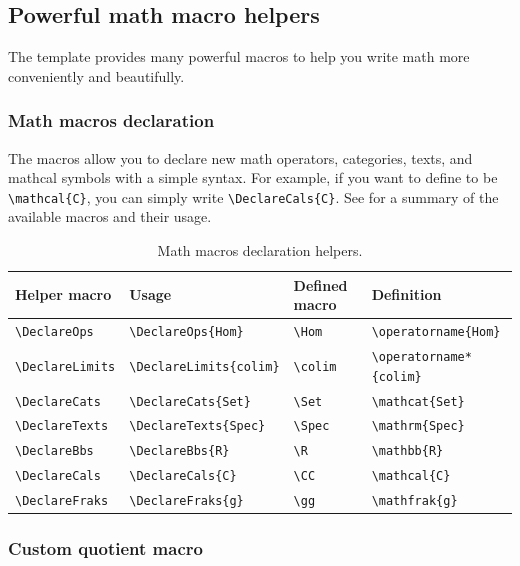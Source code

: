 \subsection{Powerful math macro helpers}

The template provides many powerful macros to help you write math more conveniently and beautifully.

\subsubsection{Math macros declaration}

The  macros allow you to declare new math operators, categories, texts, and mathcal symbols with a simple syntax.
For example, if you want to define \macro{\CC} to be \verb|\mathcal{C}|, you can simply write \verb|\DeclareCals{C}|.
See  for a summary of the available macros and their usage.

\begin{table}[!ht]
  \centering

  \begin{tabular}{llll}
    \hline\hline
    \textbf{Helper macro} & \textbf{Usage} & \textbf{Defined macro} & \textbf{Definition} \\
    \hline
    \verb|\DeclareOps| & \verb|\DeclareOps{Hom}| & \verb|\Hom| & \verb|\operatorname{Hom}| \\
    \verb|\DeclareLimits| & \verb|\DeclareLimits{colim}| & \verb|\colim| & \verb|\operatorname*{colim}| \\
    \verb|\DeclareCats| & \verb|\DeclareCats{Set}| & \verb|\Set| & \verb|\mathcat{Set}| \\
    \verb|\DeclareTexts| & \verb|\DeclareTexts{Spec}| & \verb|\Spec| & \verb|\mathrm{Spec}| \\
    \verb|\DeclareBbs| & \verb|\DeclareBbs{R}| & \verb|\R| & \verb|\mathbb{R}| \\
    \verb|\DeclareCals| & \verb|\DeclareCals{C}| & \verb|\CC| & \verb|\mathcal{C}| \\
    \verb|\DeclareFraks| & \verb|\DeclareFraks{g}| & \verb|\gg| & \verb|\mathfrak{g}| \\
    \hline\hline
  \end{tabular}

  \caption{Math macros declaration helpers.}
  \label{tab:math-macros-declaration-helpers}
\end{table}

\subsubsection{Custom quotient macro}

